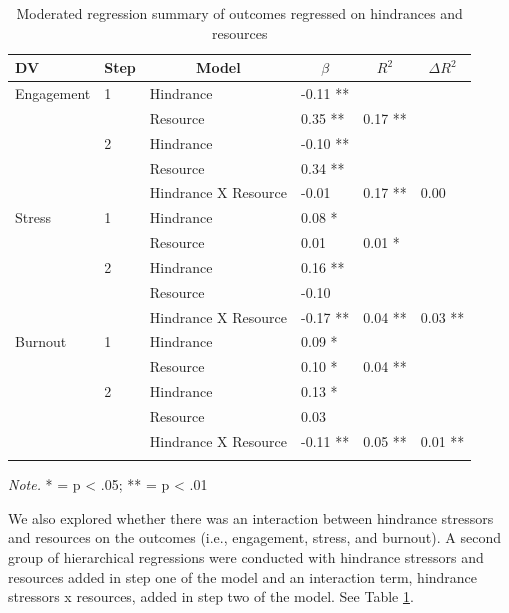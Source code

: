\documentclass[
  man,mask]{apa7}
\begin{document}
\begin{table}[tbp]

\begin{center}
\begin{threeparttable}

\caption{\label{tab:hind-resource-table}Moderated regression summary of outcomes regressed on hindrances and resources}

\begin{tabular}{llllll}
\toprule
DV & \multicolumn{1}{c}{Step} & \multicolumn{1}{c}{Model} & \multicolumn{1}{c}{$\beta$} & \multicolumn{1}{c}{$R^2$} & \multicolumn{1}{c}{$\Delta R^2$}\\
\midrule
Engagement & 1 & Hindrance & -0.11 ** &  & \\
 &  & Resource & 0.35 ** & 0.17 ** & \\
 & 2 & Hindrance & -0.10 ** &  & \\
 &  & Resource & 0.34 ** &  & \\
 &  & Hindrance X Resource & -0.01 & 0.17 ** & 0.00\\
Stress & 1 & Hindrance & 0.08 * &  & \\
 &  & Resource & 0.01 & 0.01 * & \\
 & 2 & Hindrance & 0.16 ** &  & \\
 &  & Resource & -0.10 &  & \\
 &  & Hindrance X Resource & -0.17 ** & 0.04 ** & 0.03 **\\
Burnout & 1 & Hindrance & 0.09 * &  & \\
 &  & Resource & 0.10 * & 0.04 ** & \\
 & 2 & Hindrance & 0.13 * &  & \\
 &  & Resource & 0.03 &  & \\
 &  & Hindrance X Resource & -0.11 ** & 0.05 ** & 0.01 **\\
\bottomrule
\addlinespace
\end{tabular}

\begin{tablenotes}[para]
\normalsize{\textit{Note.} * = p < .05; ** = p < .01}
\end{tablenotes}

\end{threeparttable}
\end{center}

\end{table}

We also explored whether there was an interaction between hindrance stressors and resources on the outcomes (i.e., engagement, stress, and burnout). A second group of hierarchical regressions were conducted with hindrance stressors and resources added in step one of the model and an interaction term, hindrance stressors x resources, added in step two of the model. See Table \ref{tab:hind-resource-table}.
\end{document}
